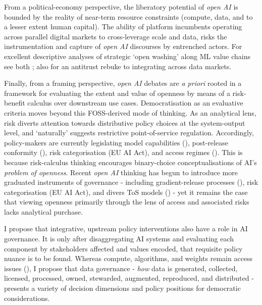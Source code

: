 From a political-economy perspective, the liberatory potential of \textit{open AI} is bounded by the reality of near-term resource constraints (compute, data, and to a lesser extent human capital). The ability of platform incumbents operating across parallel digital markets to cross-leverage scale and data, risks the instrumentation and capture of \textit{open AI} discourses by entrenched actors. For excellent descriptive analyses of strategic ‘open washing’ along ML value chains see both \textcite{graywidder2023OpenBusinessBiga, liesenfeld2023OpeningChatGPTTracking}; also \textcite{KhanAmazon2017} for an antitrust rebuke to integrating across data markets.

Finally, from a framing perspective, \textit{open AI} debates are \textit{a priori} rooted in a framework for evaluating the extent and value of openness by means of a risk-benefit calculus over downstream  use cases. Democratisation as an evaluative criteria moves beyond this FOSS-derived mode of thinking. As an analytical lens, risk diverts attention towards distributive policy choices at the system-output level, and `naturally' suggests restrictive point-of-service regulation. Accordingly, policy-makers are currently legislating model capabilities (\cite{bommasani2022OpportunitiesRisksFoundation}), post-release conformity (\cite{mokander2022ConformityAssessmentsPostmarket}), risk categorisation (EU AI Act), and access regimes (\cite{shevlane2022StructuredAccessEmerging, bostrom2017StrategicImplicationsOpenness}). This is because risk-calculus thinking encourages binary-choice conceptualisations of AI's \textit{problem of openness}. Recent \textit{open AI} thinking has begun to introduce more graduated instruments of governance - including gradient-release processes (\cite{dpga2023ExploringGradientApproach, solaiman2023}), risk categorisation (EU AI Act), and divers ToS models (\cite{gorwa2024ModeratingModelMarketplaces}) - yet it remains the case that viewing openness primarily through the lens of access and associated risks lacks analytical purchase. 

I propose that integrative, upstream policy interventions also have a role in AI governance. It is only after disaggregating AI systems and evaluating each component by stakeholders affected and values encoded, that requisite policy nuance is to be found. Whereas compute, algorithms, and weights remain access issues (\cite{liesenfeld2023OpeningChatGPTTracking}), I propose that data governance - \textit{how} data is generated, collected, licensed, processed, owned, stewarded, augmented, reproduced, and distributed - presents a variety of decision dimensions and policy positions for democratic considerations.

